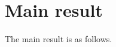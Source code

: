 \documentclass{ifacconf}
\def\rvq{{\mathbf{q}}}
\def\vs{{\bm{s}}}
\newcommand{\class}{\(\mathcal{SI}\)}
\begin{document}
    










\section{Main result}\label{sec:Results}
The main result is as follows. 
\end{document}
